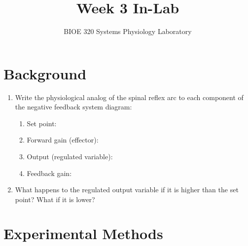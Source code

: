 \documentclass{article}
\title{Week 3 In-Lab}
\author{BIOE 320 Systems Physiology Laboratory}
\date{}
\begin{document}
\large
\maketitle

\section*{Background}
\begin{enumerate}
	\item Write the physiological analog of the spinal reflex arc to each component of the negative feedback system diagram:
	\begin{enumerate}
		\item Set point:\vspace{2cm}
		\item Forward gain (effector):\vspace{2cm}
		\item Output (regulated variable):\vspace{2cm}
		\item Feedback gain:\vspace{2cm}
	\end{enumerate}
	\item What happens to the regulated output variable if it is higher than the set point? What if it is lower?
\end{enumerate}
\pagebreak

\section*{Experimental Methods}
\end{document}
